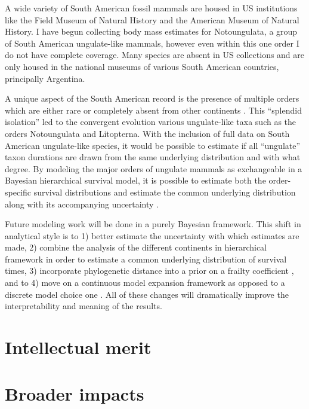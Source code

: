 \documentclass[11pt,letterpaper]{article}
\begin{document}
A wide variety of South American fossil mammals are housed in US institutions like the Field Museum of Natural History and the American Museum of Natural History. I have begun collecting body mass estimates for Notoungulata, a group of South American ungulate-like mammals, however even within this one order I do not have complete coverage. Many species are absent in US collections and are only housed in the national museums of various South American countries, principally Argentina. 

A unique aspect of the South American record is the presence of multiple orders which are either rare or completely absent from other continents \citep{Marshall1982,Macfadden1997,Macfadden2006,Flynn1998a}. This ``splendid isolation'' led to the convergent evolution various ungulate-like taxa such as the orders Notoungulata and Litopterna. With the inclusion of full data on South American ungulate-like species, it would be possible to estimate if all ``ungulate'' taxon durations are drawn from the same underlying distribution and with what degree. By modeling the major orders of ungulate mammals as exchangeable in a Bayesian hierarchical survival model, it is possible to estimate both the order-specific survival distributions and estimate the common underlying distribution along with its accompanying uncertainty \citep{Gelman2013d}.


Future modeling work will be done in a purely Bayesian framework. This shift in analytical style is to 1) better estimate the uncertainty with which estimates are made, 2) combine the analysis of the different continents in hierarchical framework in order to estimate a common underlying distribution of survival times, 3) incorporate phylogenetic distance into a prior on a frailty coefficient \citep{Banerjee2003a,Ibrahim2001}, and to 4) move on a continuous model expansion framework as opposed to a discrete model choice one \citep{Gelman2013d}. All of these changes will dramatically improve the interpretability and meaning of the results.


\section{Intellectual merit}
%
%

\section{Broader impacts}
%
%


\end{document}
